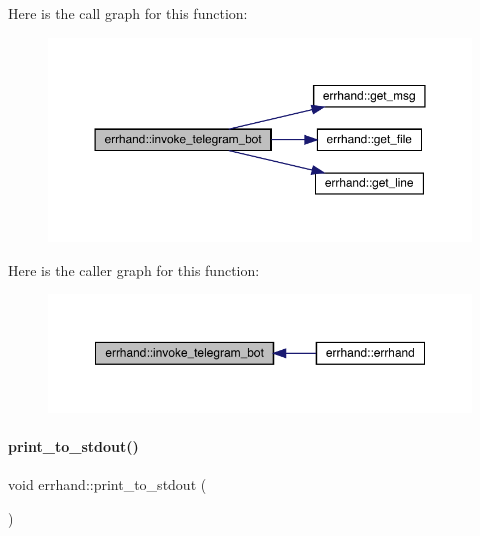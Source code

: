 Here is the call graph for this function\+:\nopagebreak
\begin{figure}[H]
\begin{center}
\leavevmode
\includegraphics[width=350pt]{classerrhand_adbc86e81b391a68d2bf9a13529c977d3_cgraph}
\end{center}
\end{figure}
Here is the caller graph for this function\+:\nopagebreak
\begin{figure}[H]
\begin{center}
\leavevmode
\includegraphics[width=350pt]{classerrhand_adbc86e81b391a68d2bf9a13529c977d3_icgraph}
\end{center}
\end{figure}
\mbox{\label{classerrhand_a5b4d8a74f1d0c6842526dc8b54e38dc2}} 
\paragraph{\texorpdfstring{print\+\_\+to\+\_\+stdout()}{print\_to\_stdout()}}
{\footnotesize\ttfamily void errhand\+::print\+\_\+to\+\_\+stdout (\begin{DoxyParamCaption}{ }\end{DoxyParamCaption})\hspace{0.3cm}{\ttfamily [inline]}}

